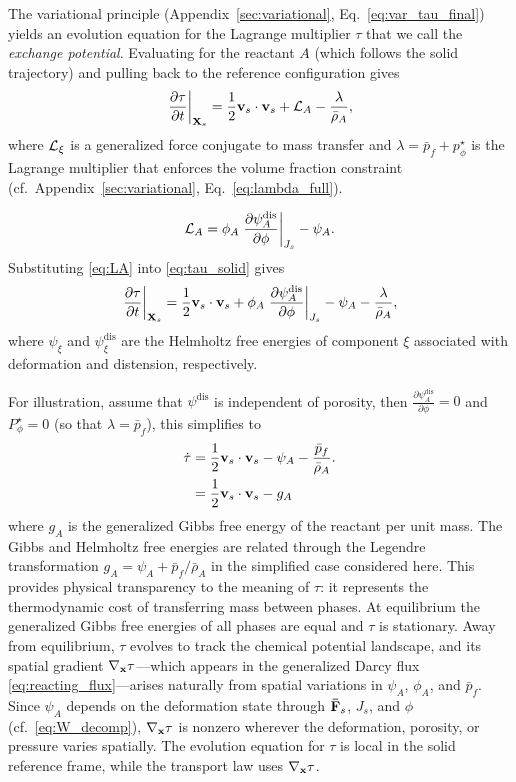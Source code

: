 \documentclass[11pt]{article}
\begin{document}
The variational principle (Appendix~\ref{sec:variational}, Eq.~\eqref{eq:var_tau_final}) yields an evolution equation for the Lagrange multiplier $\tau$ that we call the \emph{exchange potential}.  Evaluating for the reactant $A$ (which follows the solid trajectory) and pulling back to the reference configuration gives
%
\begin{equation}
  \left.\frac{\partial \tau}{\partial t}\right\vert_{\mathbf{X}_s} = \frac{1}{2} \mathbf{v}_s \cdot \mathbf{v}_s + \mathcal{L}_A - \frac{\lambda}{\bar{\rho}_A},
  \label{eq:tau_solid}
\end{equation}
%
where $\mathcal{L}_\xi$ is a generalized force conjugate to mass transfer and $\lambda = \bar{p}_f + p^\star_\phi$ is the Lagrange multiplier that enforces the volume fraction constraint (cf.\ Appendix~\ref{sec:variational}, Eq.~\eqref{eq:lambda_full}).

%
\begin{equation}
  \mathcal{L}_A = \phi_A \left.\frac{\partial \psi^\text{dis}_A}{\partial \phi}\right\vert_{J_s} - \psi_A.
  \label{eq:LA}
\end{equation}
%
Substituting \eqref{eq:LA} into \eqref{eq:tau_solid} gives
%
\begin{equation}
  \left.\frac{\partial \tau}{\partial t}\right\vert_{\mathbf{X}_s} = \frac{1}{2} \mathbf{v}_s\cdot \mathbf{v}_s + \phi_A \left.\frac{\partial \psi^\text{dis}_A}{\partial \phi}\right\vert_{J_s} - \psi_A - \frac{\lambda}{\bar{\rho}_A},
  \label{eq:tau_final}
\end{equation}
%
where $\psi_\xi$ and $\psi^\text{dis}_\xi $ are the Helmholtz free energies of component $\xi$ associated with deformation and distension, respectively. 

For illustration, assume that $\psi^{\text{dis}}$ is independent of porosity, then $\frac{\partial \psi_A^{\text{dis}}}{\partial \phi} = 0$ and $P^\star_\phi = 0$ (so that $\lambda = \bar{p}_f$), this simplifies to
%
\begin{align*}
  \dot\tau &= \frac{1}{2}\mathbf{v}_s\cdot\mathbf{v}_s - \psi_A - \frac{\bar{p}_f}{\bar{\rho}_A}. \\
           &= \frac{1}{2}\mathbf{v}_s\cdot\mathbf{v}_s - g_A
\end{align*}
%
where $g_A$ is the generalized Gibbs free energy of the reactant per unit mass.  The Gibbs and Helmholtz free energies are related through the Legendre transformation $g_A = \psi_A + \bar p_f / \bar\rho_A$ in the simplified case considered here. This provides physical transparency to the meaning of $\tau$: it represents the thermodynamic cost of transferring mass between phases.  At equilibrium the generalized Gibbs free energies of all phases are equal and $\tau$ is stationary.  Away from equilibrium, $\tau$ evolves to track the chemical potential landscape, and its spatial gradient $\nabla_{\mathbf{x}} \tau$---which appears in the generalized Darcy flux \eqref{eq:reacting_flux}---arises naturally from spatial variations in $\psi_A$, $\phi_A$, and $\bar{p}_f$. Since $\psi_A$ depends on the deformation state through $\mathbf{\bar{F}}_s$, $J_s$, and $\phi$ (cf.~\eqref{eq:W_decomp}), $\nabla_{\mathbf{x}} \tau$ is nonzero wherever the deformation, porosity, or pressure varies spatially.  The evolution equation for $\tau$ is local in the solid reference frame, while the transport law uses $\nabla_{\mathbf{x}}\tau$.
\end{document}
